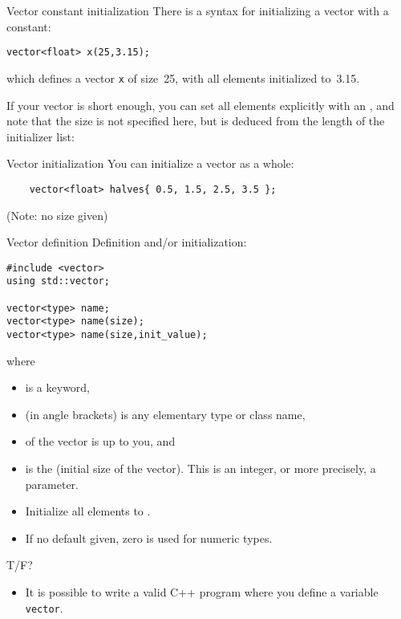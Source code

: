 \begin{slide}{Vector constant initialization}
  \label{sl:vector-initconst}
  There is a syntax for initializing a vector with a constant:
\begin{lstlisting}
vector<float> x(25,3.15);
\end{lstlisting}
which defines a vector \lstinline{x} of size~25,
with all elements initialized to~3.15.
\end{slide}

If your vector is short enough, you can set all elements explicitly with an
, and note that the size is not specified here,
but is deduced from the length of the initializer list:


\begin{slide}{Vector initialization}
  \label{sl:vector-init}
  You can initialize a vector as a whole:
  \begin{lstlisting}
    vector<float> halves{ 0.5, 1.5, 2.5, 3.5 };
  \end{lstlisting}
  (Note: no size given)
\end{slide}

\begin{slide}{Vector definition}
  \label{sl:vector-def}
  Definition and/or initialization:
\begin{lstlisting}
#include <vector>
using std::vector;

vector<type> name;
vector<type> name(size);
vector<type> name(size,init_value);
\end{lstlisting}
where
\begin{itemize}
\item {} is a keyword,
\item {} (in angle brackets) is any elementary type or class
  name,
\item {} of the vector is up to you, and
\item {} is the (initial size of the vector). This is an integer,
  or more precisely, a  parameter.
\item Initialize all elements to .
\item If no default given, zero is used for numeric types.
\end{itemize}
\end{slide}

\begin{review}
  T/F? 
  \begin{itemize}
  \item It is possible to write a valid C++ program where you define a
    variable \lstinline+vector+.
  \end{itemize}
\end{review}

